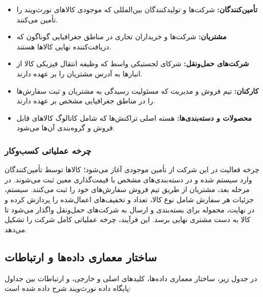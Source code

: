 \documentclass[14pt,a4paper]{extarticle}
\begin{document}
	\begin{itemize}
		\item \textbf{تأمین‌کنندگان:} شرکت‌ها و تولیدکنندگان بین‌المللی که موجودی کالاهای نورث‌ویند را تأمین می‌کنند.
		
		\item \textbf{مشتریان:} شرکت‌ها و خریداران تجاری در مناطق جغرافیایی گوناگون که دریافت‌کننده نهایی کالاها هستند.
		
		\item \textbf{شرکت‌های حمل‌ونقل:} شرکای لجستیکی واسط که وظیفه انتقال فیزیکی کالا از انبارها به آدرس مشتریان را بر عهده دارند.
		
		\item \textbf{کارکنان:} تیم فروش و مدیریت که مسئولیت رسیدگی به مشتریان و ثبت سفارش‌ها را در مناطق جغرافیایی مشخص بر عهده دارند.
		
		\item \textbf{محصولات و دسته‌بندی‌ها:} هسته اصلی تراکنش‌ها که شامل کاتالوگ کالاهای قابل فروش و گروه‌بندی آن‌ها می‌شود.
	\end{itemize}
	
	\subsubsection{چرخه عملیاتی کسب‌وکار}
	چرخه فعالیت در این شرکت از تأمین موجودی آغاز می‌شود؛ کالاها توسط تأمین‌کنندگان وارد سیستم شده و در دسته‌بندی‌های مشخص با قیمت‌گذاری معین ثبت می‌شوند. در مرحله بعد، مشتریان از طریق تیم فروش سفارش‌های خود را ثبت می‌کنند. سیستم، جزئیات هر سفارش شامل نوع کالا، تعداد و تخفیف‌های اعمال‌شده را پردازش کرده و در نهایت، محموله برای بسته‌بندی و ارسال به شرکت‌های حمل‌ونقل واگذار می‌شود تا کالا به دست مشتری نهایی برسد. این فرآیند، چرخه عملیاتی کامل شرکت را تشکیل می‌دهد.
	
	
	\subsection{ساختار معماری داده‌ها و ارتباطات}
	
	در جدول زیر، ساختار معماری داده‌ها، کلیدهای اصلی و خارجی، و ارتباطات بین جداول پایگاه داده نورث‌ویند شرح داده شده است:
	
	\vspace{0.5cm}
	
\end{document}
